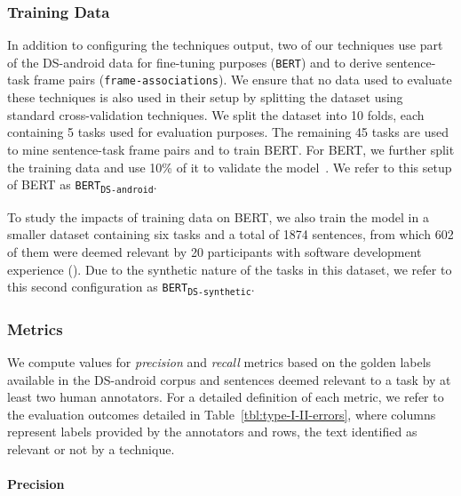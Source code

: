 \subsubsection{Training Data}


In addition to configuring the techniques output, two of our techniques use part of the  \acs{DS-android} data for fine-tuning purposes (\texttt{BERT}) and to derive sentence-task frame pairs (\texttt{frame-associations}).
We ensure that no data used to evaluate these techniques is also used in their setup by 
splitting the dataset using standard cross-validation techniques.
We split the dataset into 10 folds, each containing 5 tasks used for evaluation purposes. 
The remaining 45 tasks are used to mine sentence-task frame pairs
and to train BERT. 
For BERT, we further split the training data and use 10\% of it to validate the model~\cite{Chaparro2017, fucci2019, Petrosyan2015}.
We refer to this setup of BERT as \texttt{BERT\textsubscript{DS-android}}.


To study the impacts of training data on BERT, we also train the model in a smaller dataset containing six tasks and a total of 1874 sentences, from which 602 of them were deemed relevant by 20 participants with software development experience (). Due to the synthetic nature of the tasks in this dataset, we refer to this 
second configuration as \texttt{BERT\textsubscript{DS-synthetic}}.




\subsubsection{Metrics}


We compute values for \textit{precision} and \textit{recall} metrics based on the golden labels available in the \acs{DS-android} corpus and sentences deemed relevant to a task by at least two human annotators.
For a detailed definition of each metric, we refer to the evaluation outcomes detailed in Table~\ref{tbl:type-I-II-errors}, where  columns represent  labels provided by the annotators and rows,
the text identified as relevant or not by a technique.

% 

\medskip




\paragraph{\textbf{Precision}}

